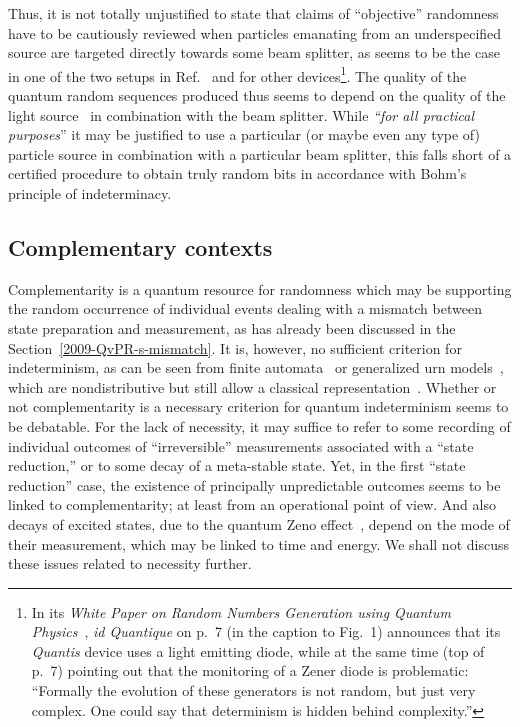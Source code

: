 \documentclass[%
 preprint,
 showpacs,
 showkeys,
 preprintnumbers,
 amsmath,amssymb,
 aps,
 prl,
  longbibliography,
 ]{revtex4-1}
\begin{document}
Thus, it is not totally unjustified to state that claims of ``objective'' randomness
have to be cautiously reviewed
when particles emanating from an underspecified source are targeted directly towards some beam splitter,
as seems to be the case in one of the two setups in Ref.~\cite[Fig.~1(a)]{zeilinger:qct}
and for other devices\footnote{In its {\em White Paper on Random Numbers Generation
using Quantum Physics}~\cite{Quantis}, {\em id Quantique} on p.~7 (in the caption to Fig.~1) announces that
its {\em Quantis} device  uses a light emitting diode,
while at the same time (top of p.~7) pointing out that the monitoring of a Zener diode is problematic:
``Formally the evolution of these generators is not random, but just very complex. One
could say that determinism is hidden behind complexity.''
}.
The quality of the quantum random
sequences produced thus seems to depend on the quality of the light source~\cite{stefanov-2000}
in combination with the beam splitter.
While {\em ``for all practical purposes}''
it may be justified to use a particular (or maybe even any type of) particle source
in combination with a particular beam splitter, this
falls short of a certified procedure to obtain truly random bits
in accordance with Bohm's principle of indeterminacy.


\subsection{Complementary contexts}

Complementarity is a quantum resource for randomness
which may be supporting the random occurrence of individual events
dealing with a mismatch between state preparation and measurement,
as has already been discussed in the Section~\ref{2009-QvPR-s-mismatch}.
It is, however, no sufficient criterion for indeterminism, as can be seen from finite automata~\cite{e-f-moore} or generalized
urn models~\cite{wright}, which are nondistributive but still allow a classical representation~\cite{svozil-2001-eua,svozil-2005-ln1e}.
Whether or not complementarity is a necessary criterion for quantum indeterminism seems to be debatable.
For the lack of necessity, it may suffice to refer to some recording of individual outcomes of
``irreversible'' measurements associated with a ``state reduction,''
or to some decay of a meta-stable state.
Yet, in the first ``state reduction'' case, the existence of principally unpredictable outcomes
seems to be linked to complementarity; at least from an operational point of view.
And also decays of excited states, due to the quantum Zeno effect~\cite{misra:756},
depend on the mode of their measurement, which may be linked to time and energy.
We shall not discuss these issues related to necessity further.
\end{document}
